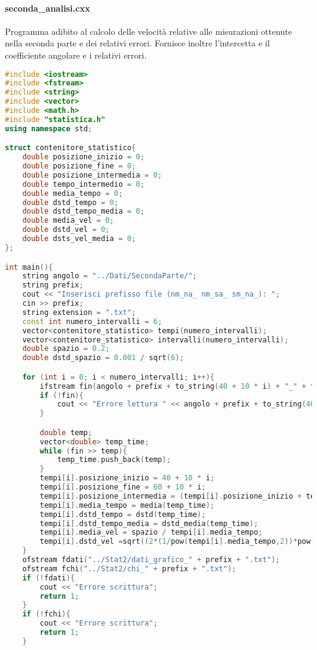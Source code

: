 \documentclass[a4paper,11pt,oneside]{article}
\begin{document}
\paragraph{seconda\_analisi.cxx} Programma adibito al calcolo delle velocità relative alle misurazioni ottenute nella seconda parte e dei relativi errori. Fornisce inoltre l'intercetta e il coefficiente angolare e i relativi errori.
\begin{lstlisting}[language=C++, label=lst:seconda_analisi.cxx, caption=seconda\_analisi.cxx]
#include <iostream>
#include <fstream>
#include <string>
#include <vector>
#include <math.h>
#include "statistica.h"
using namespace std;

struct contenitore_statistico{
    double posizione_inizio = 0;
    double posizione_fine = 0;
    double posizione_intermedia = 0;
    double tempo_intermedio = 0;
    double media_tempo = 0;
    double dstd_tempo = 0;
    double dstd_tempo_media = 0;
    double media_vel = 0;
    double dstd_vel = 0;
    double dsts_vel_media = 0;
};

int main(){
    string angolo = "../Dati/SecondaParte/";
    string prefix;
    cout << "Inserisci prefisso file (nm_na_ nm_sa_ sm_na_): ";
    cin >> prefix;
    string extension = ".txt";
    const int numero_intervalli = 6;
    vector<contenitore_statistico> tempi(numero_intervalli);
    vector<contenitore_statistico> intervalli(numero_intervalli);
    double spazio = 0.2;
    double dstd_spazio = 0.001 / sqrt(6);

    for (int i = 0; i < numero_intervalli; i++){
        ifstream fin(angolo + prefix + to_string(40 + 10 * i) + "_" + to_string(60 + 10 * i) + extension);
        if (!fin){
            cout << "Errore lettura " << angolo + prefix + to_string(40 + 10 * i) + "_" + to_string(60 + 10 * i) + extension << endl;
        }

        double temp;
        vector<double> temp_time;
        while (fin >> temp){
            temp_time.push_back(temp);
        }
        tempi[i].posizione_inizio = 40 + 10 * i;
        tempi[i].posizione_fine = 60 + 10 * i;
        tempi[i].posizione_intermedia = (tempi[i].posizione_inizio + tempi[i].posizione_fine) / 2;
        tempi[i].media_tempo = media(temp_time);
        tempi[i].dstd_tempo = dstd(temp_time);
        tempi[i].dstd_tempo_media = dstd_media(temp_time);
        tempi[i].media_vel = spazio / tempi[i].media_tempo;
        tempi[i].dstd_vel =sqrt((2*(1/pow(tempi[i].media_tempo,2))*pow(dstd_spazio,2))+(0.2*0.2*(1/pow(tempi[i].media_tempo,4))*(pow(tempi[i].dstd_tempo_media,2))));
    }
    ofstream fdati("../Stat2/dati_grafico_" + prefix + ".txt");
    ofstream fchi("../Stat2/chi_" + prefix + ".txt");
    if (!fdati){
        cout << "Errore scrittura";
        return 1;
    }
    if (!fchi){
        cout << "Errore scrittura";
        return 1;
    }


\end{lstlisting}
\end{document}
